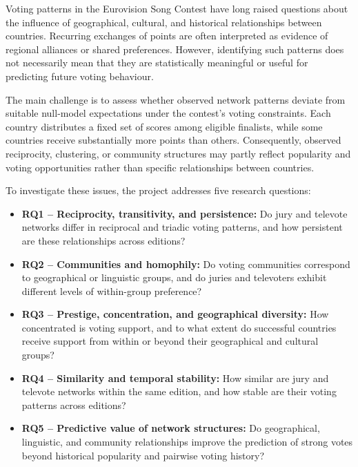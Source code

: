 \documentclass[12pt,a4paper]{article}
\begin{document}
Voting patterns in the Eurovision Song Contest have long
raised questions about the influence of geographical,
cultural, and historical relationships between countries.
Recurring exchanges of points are often interpreted
as evidence of regional alliances or shared preferences.
However, identifying such patterns does not necessarily
mean that they are statistically meaningful or useful
for predicting future voting behaviour.

The main challenge is to assess whether observed network
patterns deviate from suitable null-model expectations
under the contest's voting constraints. Each country distributes a fixed
set of scores among eligible finalists, while some
countries receive substantially more points than others.
Consequently, observed reciprocity, clustering, or
community structures may partly reflect popularity
and voting opportunities rather than specific
relationships between countries.

To investigate these issues, the project addresses five
research questions:

\begin{itemize}
    \item \textbf{RQ1 -- Reciprocity, transitivity,
    and persistence:}
    Do jury and televote networks differ in reciprocal
    and triadic voting patterns, and how persistent
    are these relationships across editions?

    \item \textbf{RQ2 -- Communities and homophily:}
    Do voting communities correspond to geographical
    or linguistic groups, and do juries and televoters
    exhibit different levels of within-group preference?

    \item \textbf{RQ3 -- Prestige, concentration,
    and geographical diversity:}
    How concentrated is voting support, and to what
    extent do successful countries receive support
    from within or beyond their geographical and
    cultural groups?

    \item \textbf{RQ4 -- Similarity and temporal stability:}
    How similar are jury and televote networks within
    the same edition, and how stable are their voting
    patterns across editions?

    \item \textbf{RQ5 -- Predictive value of network
    structures:}
    Do geographical, linguistic, and community
    relationships improve the prediction of strong
    votes beyond historical popularity and
    pairwise voting history?
\end{itemize}
\end{document}
